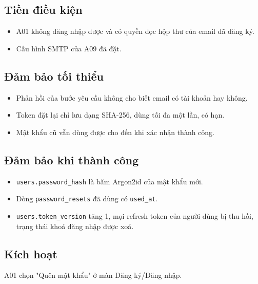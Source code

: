 \subsection{Tiền điều kiện}
\begin{itemize}
\item A01 không đăng nhập được và có quyền đọc hộp thư của email đã đăng ký.
\item Cấu hình SMTP của A09 đã đặt.
\end{itemize}
\subsection{Đảm bảo tối thiểu}
\begin{itemize}
\item Phản hồi của bước yêu cầu không cho biết email có tài khoản hay không.
\item Token đặt lại chỉ lưu dạng SHA-\allowbreak{}256, dùng tối đa một lần, có hạn.
\item Mật khẩu cũ vẫn dùng được cho đến khi xác nhận thành công.
\end{itemize}
\subsection{Đảm bảo khi thành công}
\begin{itemize}
\item {\small\texttt{users.\allowbreak{}password\_\allowbreak{}\allowbreak{}hash}} là băm Argon2id của mật khẩu mới.
\item Dòng {\small\texttt{password\_\allowbreak{}\allowbreak{}resets}} đã dùng có {\small\texttt{used\_\allowbreak{}\allowbreak{}at}}.
\item {\small\texttt{users.\allowbreak{}token\_\allowbreak{}\allowbreak{}version}} tăng 1, mọi refresh token của người dùng bị thu hồi, trạng thái khoá đăng nhập được xoá.
\end{itemize}
\subsection{Kích hoạt}
A01 chọn "Quên mật khẩu" ở màn Đăng ký/\allowbreak{}Đăng nhập.

